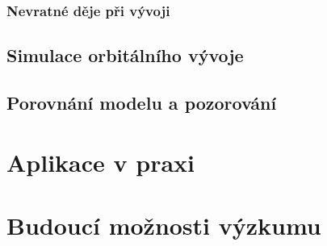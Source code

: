 \documentclass[A4paper, 12pt, oneside]{book}
\begin{document}
\subsection{Nevratné děje při vývoji}
\section{Simulace orbitálního vývoje}
\section{Porovnání modelu a pozorování}

\chapter{Aplikace v praxi}
\chapter{Budoucí možnosti výzkumu}

\printbibliography
\end{document}
